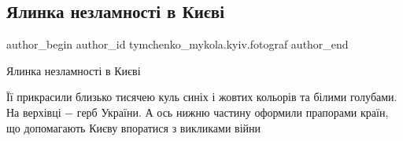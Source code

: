  
 
 
 
 
 
\subsection{Ялинка незламності в Києві}
\label{sec:18_12_2022.fb.tymchenko_mykola.kyiv.fotograf.2.jalynka_nezlamnosti}
 
\ifcmt
 author_begin
   author_id tymchenko_mykola.kyiv.fotograf
 author_end
\fi

Ялинка незламності в Києві🎄

Її прикрасили близько тисячею куль синіх і жовтих кольорів та білими голубами.
На верхівці − герб України. А ось нижню частину оформили прапорами країн, що
допомагають Києву впоратися з викликами війни 🤝

